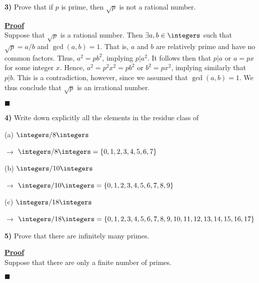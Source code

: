 \documentclass[12pt,a4paper]{article}
\newcommand{\prob}[2]{\textbf{#1)} #2}
\newenvironment{proof}
{
\textbf{\underline{Proof}} \\
}
{
\begin{flushright}
$\blacksquare$
\end{flushright}}
\begin{document}
\prob{3}{Prove that if $p$ is prime, then $\sqrt{p}$ is not a rational number.} 

\begin{proof}
Suppose that $\sqrt{p}$ is a rational number. Then $\exists a,b \in \integers$ such that $\sqrt{p} = a/b$ and $\gcd(a,b) = 1$. That is, $a$ and $b$ are relatively prime and have no common factors. Thus, $a^2 = pb^2$, implying $p|a^2$. It follows then that $p|a$ or $a = px$ for some integer $x$. Hence, $a^2 = p^2x^2 = pb^2$ or $b^2 = px^2$, implying similarly that $p|b$. This is a contradiction, however, since we assumed that $\gcd(a,b) = 1$. We thus conclude that $\sqrt{p}$ is an irrational number.
\end{proof}

\prob{4}{Write down explicitly all the elements in the residue class of}

(a) $\integers/8\integers$

$\rightarrow$ $\integers/8\integers = \{0,1,2,3,4,5,6,7\}$

(b) $\integers/10\integers$

$\rightarrow$ $\integers/10\integers = \{0,1,2,3,4,5,6,7,8,9\}$

(c) $\integers/18\integers$

$\rightarrow$ $\integers/18\integers = \{0,1,2,3,4,5,6,7,8,9,10,11,12,13,14,15,16,17\}$

\prob{5}{Prove that there are infinitely many primes.}

\begin{proof}
Suppose that there are only a finite number of primes.
\end{proof}
\end{document}
